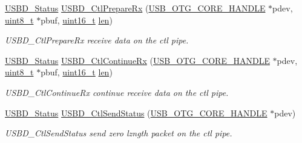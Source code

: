 \begin{DoxyCompactItemize}
\hyperlink{group___u_s_b_d___c_o_r_e___exported___defines_ga1c59ec10075b576176aa51c9ef4e9fc4}{U\-S\-B\-D\-\_\-\-Status} \hyperlink{group___u_s_b_d___i_o_r_e_q___exported___functions_prototype_gafbfbe059daddfa13cd57db3e9613a71b}{U\-S\-B\-D\-\_\-\-Ctl\-Prepare\-Rx} (\hyperlink{group___u_s_b___c_o_r_e___exported___types_gaf76054c11eb8a3367907aad7ae700e80}{U\-S\-B\-\_\-\-O\-T\-G\-\_\-\-C\-O\-R\-E\-\_\-\-H\-A\-N\-D\-L\-E} $\ast$pdev, \hyperlink{stdint_8h_aba7bc1797add20fe3efdf37ced1182c5}{uint8\-\_\-t} $\ast$pbuf, \hyperlink{stdint_8h_a273cf69d639a59973b6019625df33e30}{uint16\-\_\-t} \hyperlink{mavlink__helpers_8h_aba59486c1504340293255a065b546e3a}{len})
\begin{DoxyCompactList}\small\item\em U\-S\-B\-D\-\_\-\-Ctl\-Prepare\-Rx receive data on the ctl pipe. \end{DoxyCompactList}\item 
\hyperlink{group___u_s_b_d___c_o_r_e___exported___defines_ga1c59ec10075b576176aa51c9ef4e9fc4}{U\-S\-B\-D\-\_\-\-Status} \hyperlink{group___u_s_b_d___i_o_r_e_q___exported___functions_prototype_ga4f4543400519f6194c3c50e9eddf38fb}{U\-S\-B\-D\-\_\-\-Ctl\-Continue\-Rx} (\hyperlink{group___u_s_b___c_o_r_e___exported___types_gaf76054c11eb8a3367907aad7ae700e80}{U\-S\-B\-\_\-\-O\-T\-G\-\_\-\-C\-O\-R\-E\-\_\-\-H\-A\-N\-D\-L\-E} $\ast$pdev, \hyperlink{stdint_8h_aba7bc1797add20fe3efdf37ced1182c5}{uint8\-\_\-t} $\ast$pbuf, \hyperlink{stdint_8h_a273cf69d639a59973b6019625df33e30}{uint16\-\_\-t} \hyperlink{mavlink__helpers_8h_aba59486c1504340293255a065b546e3a}{len})
\begin{DoxyCompactList}\small\item\em U\-S\-B\-D\-\_\-\-Ctl\-Continue\-Rx continue receive data on the ctl pipe. \end{DoxyCompactList}\item 
\hyperlink{group___u_s_b_d___c_o_r_e___exported___defines_ga1c59ec10075b576176aa51c9ef4e9fc4}{U\-S\-B\-D\-\_\-\-Status} \hyperlink{group___u_s_b_d___i_o_r_e_q___exported___functions_prototype_gaa3d017e61e3a77abbf7560f94fd945da}{U\-S\-B\-D\-\_\-\-Ctl\-Send\-Status} (\hyperlink{group___u_s_b___c_o_r_e___exported___types_gaf76054c11eb8a3367907aad7ae700e80}{U\-S\-B\-\_\-\-O\-T\-G\-\_\-\-C\-O\-R\-E\-\_\-\-H\-A\-N\-D\-L\-E} $\ast$pdev)
\begin{DoxyCompactList}\small\item\em U\-S\-B\-D\-\_\-\-Ctl\-Send\-Status send zero lzngth packet on the ctl pipe. \end{DoxyCompactList}\item 

\end{DoxyCompactItemize}

